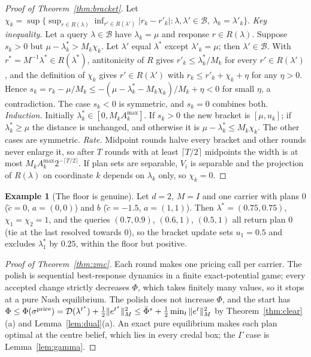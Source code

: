 \documentclass[preprint,11pt]{elsarticle}
\theoremstyle{definition}
\newtheorem{example}[theorem]{Example}
\theoremstyle{remark}
\newcommand{\Amax}{A^{\max}}
\begin{document}
\begin{proof}[Proof of Theorem~\ref{thm:bracket}]
Let $\chi_k=\sup\{\sup_{r\in R(\lambda)}\inf_{r'\in R(\lambda')}|r_k-r'_k|:\lambda,\lambda'\in\mathcal B,\ \lambda_k=\lambda'_k\}$. \emph{Key inequality.} Let a query $\lambda\in\mathcal B$ have $\lambda_k=\mu$ and response $r\in R(\lambda)$. Suppose $s_k>0$ but $\mu-\lambda^*_k>M_k\chi_k$. Let $\lambda'$ equal $\lambda^*$ except $\lambda'_k=\mu$; then $\lambda'\in\mathcal B$. With $r^*=M^{-1}\lambda^*\in R(\lambda^*)$, antitonicity of $R$ gives $r'_k\le\lambda^*_k/M_k$ for every $r'\in R(\lambda')$, and the definition of $\chi_k$ gives $r'\in R(\lambda')$ with $r_k\le r'_k+\chi_k+\eta$ for any $\eta>0$. Hence $s_k=r_k-\mu/M_k\le-(\mu-\lambda^*_k-M_k\chi_k)/M_k+\eta<0$ for small $\eta$, a contradiction. The case $s_k<0$ is symmetric, and $s_k=0$ combines both. \emph{Induction.} Initially $\lambda^*_k\in[0,M_k\Amax_k]$. If $s_k>0$ the new bracket is $[\mu,u_k]$; if $\lambda^*_k\ge\mu$ the distance is unchanged, and otherwise it is $\mu-\lambda^*_k\le M_k\chi_k$. The other cases are symmetric. \emph{Rate.} Midpoint rounds halve every bracket and other rounds never enlarge it, so after $T$ rounds with at least $\lceil T/2\rceil$ midpoints the width is at most $M_k\Amax_k2^{-\lceil T/2\rceil}$. If plan sets are separable, $V_i$ is separable and the projection of $R(\lambda)$ on coordinate $k$ depends on $\lambda_k$ only, so $\chi_k=0$.
\end{proof}

\begin{example}[The floor is genuine]\label{ex:kappa}
Let $d=2$, $M=I$ and one carrier with plans $0$ ($\tilde c=0$, $a=(0,0)$) and $b$ ($\tilde c=-1.5$, $a=(1,1)$). Then $\lambda^*=(0.75,0.75)$, $\chi_1=\chi_2=1$, and the queries $(0.7,0.9)$, $(0.6,1)$, $(0.5,1)$ all return plan $0$ (tie at the last resolved towards $0$), so the bracket update sets $u_1=0.5$ and excludes $\lambda^*_1$ by $0.25$, within the floor but positive.
\end{example}

\begin{proof}[Proof of Theorem~\ref{thm:zmc}]
Each round makes one pricing call per carrier. The polish is sequential best-response dynamics in a finite exact-potential game; every accepted change strictly decreases $\Phi$, which takes finitely many values, so it stops at a pure Nash equilibrium. The polish does not increase $\Phi$, and the start has $\Phi\le\Phi(\sigma^{\rm price})=\mathcal D(\lambda^{t^\star})+\tfrac12\|e^{t^\star}\|_M^2\le\bar\Phi^*+\tfrac12\min_t\|e^t\|_M^2$ by Theorem~\ref{thm:clear}(a) and Lemma~\ref{lem:dual}(a). An exact pure equilibrium makes each plan optimal at the centre belief, which lies in every credal box; the $\Gamma$ case is Lemma~\ref{lem:gamma}.
\end{proof}
\end{document}
